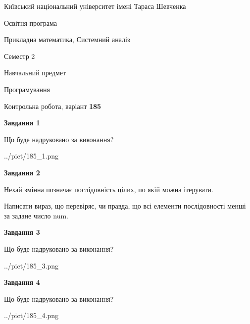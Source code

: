 \documentclass[12pt, ukrainian]{article}
\begin{document}
{{\begin {small}\par
{ \center  Київський національний університет імені Тараса Шевченка \par}
{\parbox {5 cm}{Освітня програма \hfill}{\parbox {8 cm}{Прикладна математика, Системний аналіз \hfill}}\parbox {5 cm}{\hfill Семестр 2}}\par
{\parbox {5 cm} {Навчальний предмет \hfill}\parbox {7 cm}{Програмування \hfill}\parbox {6cm}{\hfill}\par}\vspace{-7pt} \end{small}}{\center Контрольна робота, варіант  \No \textbf
{ 185 }\par}}
{
\begin {large}
{\begin {center}\textbf{Завдання 1}\end {center}}\par
Що буде надруковано за виконання?\par\par
\begin{center}
	{../pict/185_1.png}
\end{center}
\newpage

{\begin {center}\textbf{Завдання 2}\end {center}}\par
Нехай змінна  позначає послідовність цілих, по якій можна ітерувати.

Написати вираз, що перевіряє, чи правда, що всі елементи послідовності менші за задане число num.\par
\newpage

{\begin {center}\textbf{Завдання 3}\end {center}}\par
Що буде надруковано за виконання?\par
\begin{center}
	{../pict/185_3.png}
\end{center}
\newpage

{\begin {center}\textbf{Завдання 4}\end {center}}\par
Що буде надруковано за виконання?\par
\begin{center}
	{../pict/185_4.png}
\end{center}
\newpage


\end{large}}
\end{document}
